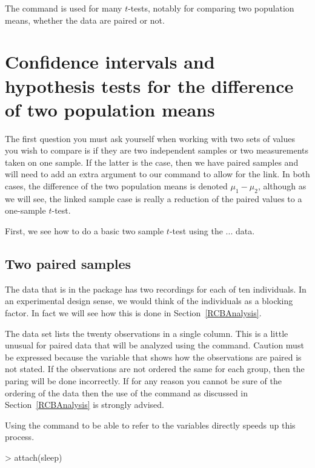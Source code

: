 The  command is used for many $t$-tests, notably for comparing two population means, whether the data are paired or not. 
 
\section{Confidence intervals and hypothesis tests for the difference of two population means} 
 
The first question you must ask yourself when working with two sets of values you wish to compare is if they are two independent samples or two measurements taken on one sample. If the latter is the case, then we have paired samples and will need to add an extra argument to our command to allow for the link. In both cases, the difference of the two population means is denoted $\mu_1-\mu_2$, although as we will see, the linked sample case is really a reduction of the paired values to a one-sample $t$-test.  
 
First, we see how to do a basic two sample $t$-test using the ... data. 
 
\subsection{Two paired samples} 
\label{PairedSamplesTTest} 
 
The  data that is in the  package has two recordings for each of ten individuals. In an experimental design sense, we would think of the individuals as a blocking factor. In fact we will see how this is done in Section~\ref{RCBAnalysis}. 
 
The data set lists the twenty observations in a single column. This is a little unusual for paired data that will be analyzed using the  command. Caution must be expressed because the variable that shows how the observations are paired is not stated. If the observations are not ordered the same for each group, then the paring will be done incorrectly. If for any reason you cannot be sure of the ordering of the data then the use of the  command as discussed in Section~\ref{RCBAnalysis} is strongly advised. 
 
Using the  command to be able to refer to the variables directly speeds up this process. 
\begin{Schunk}
\begin{Sinput}
> attach(sleep) 
\end{Sinput}
\end{Schunk}
 

